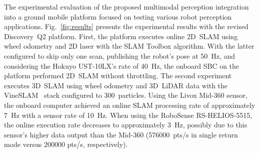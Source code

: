 \documentclass[letterpaper,10pt,conference]{IEEEtran} %
\def\figref#1{Fig.~\ref{#1}}
\begin{document}

The experimental evaluation of the proposed multimodal perception integration
into a ground mobile platform focused on
testing various robot perception applications.
\figref{fig:results} presents the experimental results with the
revised Discovery~Q2 platform. First, the platform executes online 2D~SLAM
using wheel odometry and 2D laser with the
SLAM Toolbox algorithm\cite{macenski2021joss}. With the latter configured to
skip only one scan, publishing the robot's pose at 50~Hz, and considering the
Hokuyo UST-10LX's rate of 40~Hz, the onboard SBC on the platform performed
2D~SLAM without throttling.
The second experiment executes 3D~SLAM using wheel odometry and 3D~LiDAR data
with the VineSLAM~\cite{aguiar2023vineslam} stack configured to 300~particles.
Using the Livox Mid-360 sensor, the onboard computer achieved an online SLAM
processing rate of approximately 7~Hz with a sensor rate of 10~Hz.
When using the RoboSense RS-HELIOS-5515, the online execution rate decreases to
approximately 3~Hz, possibly due to this sensor's higher data output
than the Mid-360 (576000~pts/s in single return mode versus 200000 pts/s,
respectively).
\end{document}

